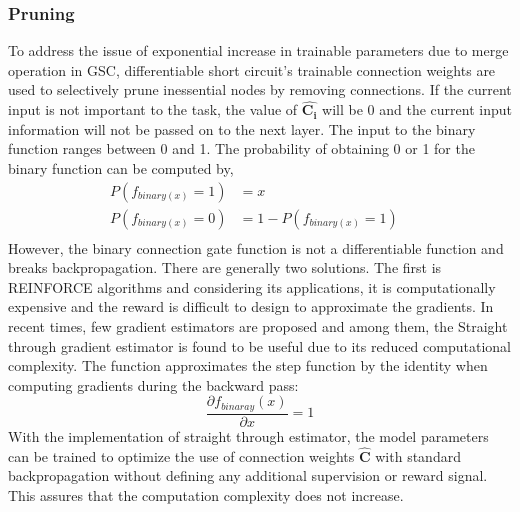 \documentclass{article}
\let\oldhat\hat
\renewcommand{\hat}[1]{\oldhat{\mathbf{#1}}}
\begin{document}
\subsubsection{Pruning}
\label{sec:Pruning}
To address the issue of exponential increase in trainable parameters due to merge operation in GSC, differentiable short circuit's trainable connection weights are used to selectively prune inessential nodes by removing connections.  If the current input is not important to the task, the value of $\hat{C_{i}}$ will be 0 and the current input information will not be passed on to the next layer. The input to the binary function ranges between 0 and 1. The probability of obtaining 0 or 1 for the binary function can be computed by,
\begin{equation}
\label{eq:ffn_math_representation}
\begin{aligned}
   P(f_{binary(x)}=1) &=x&\\
   P(f_{binary(x)}=0) &=1-P(f_{binary(x)}=1)&\\   
\end{aligned}
\end{equation}
However, the binary connection gate function is not a differentiable function and breaks backpropagation. There are generally two solutions. The first is REINFORCE algorithms \cite{Williams1992SimpleSG} and considering its applications, it is computationally expensive and the reward is difficult to design to approximate the gradients. In recent times, few gradient estimators are proposed and among them, the Straight through gradient estimator \cite{Bengio2013EstimatingOP} is found to be useful due to its reduced computational complexity. The function approximates the step function by the identity when computing gradients during the backward pass:
\begin{equation}
\frac{\partial{f_{binaray}(x)}}{\partial x}=1
\end{equation}
With the implementation of straight through estimator, the model parameters can be trained to optimize the use of connection weights $\hat{C}$ with standard backpropagation without defining any additional supervision or reward signal. This assures that the computation complexity does not increase.
\end{document}
